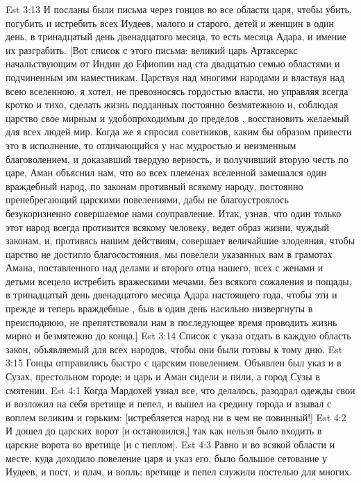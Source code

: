 \vs Est 3:13 И посланы были письма через гонцов во все области царя, чтобы убить, погубить и истребить всех Иудеев, малого и старого, детей и женщин в один день, в тринадцатый день двенадцатого месяца, то есть месяца Адара, и имение их разграбить. [Вот список с этого письма: великий царь Артаксеркс начальствующим от Индии до Ефиопии над ста двадцатью семью областями и подчиненным им наместникам. Царствуя над многими народами и властвуя над всею вселенною, я хотел, не превозносясь гордостью власти, но управляя всегда кротко и тихо, сделать жизнь подданных постоянно безмятежною и, соблюдая царство свое мирным и удобопроходимым до пределов , восстановить желаемый для всех людей мир. Когда же я спросил советников, каким бы образом привести это в исполнение, то отличающийся у нас мудростью и  неизменным благоволением, и доказавший твердую верность, и получивший вторую честь по царе, Аман объяснил нам, что во всех племенах вселенной замешался один враждебный народ, по законам  противный всякому народу, постоянно пренебрегающий царскими повелениями, дабы не благоустроялось безукоризненно совершаемое нами соуправление. Итак, узнав, что один только этот народ всегда противится всякому человеку, ведет образ жизни, чуждый законам, и, противясь нашим действиям, совершает величайшие злодеяния, чтобы царство  не достигло благосостояния, мы повелели указанных вам в грамотах Амана, поставленного над делами и второго отца нашего, всех с женами и детьми всецело истребить вражескими мечами, без всякого сожаления и пощады, в тринадцатый день двенадцатого месяца Адара настоящего года, чтобы эти и прежде и теперь враждебные , быв в один день насильно низвергнуты в преисподнюю, не препятствовали нам в последующее время проводить жизнь мирно и безмятежно до конца.]
\vs Est 3:14 Список с указа отдать в каждую область  закон, объявляемый для всех народов, чтобы они были готовы к тому дню.
\vs Est 3:15 Гонцы отправились быстро с царским повелением. Объявлен был указ и в Сузах, престольном городе; и царь и Аман сидели и пили, а город Сузы  в смятении.
\vs Est 4:1 Когда Мардохей узнал все, что делалось, разодрал одежды свои и возложил на себя вретище и пепел, и вышел на средину города и взывал с воплем великим и горьким: [истребляется народ ни в чем не повинный!]
\vs Est 4:2 И дошел до царских ворот [и остановился,] так как нельзя было входить в царские ворота во вретище [и с пеплом].
\vs Est 4:3 Равно и во всякой области и месте, куда  доходило повеление царя и указ его, было большое сетование у Иудеев, и пост, и плач, и вопль; вретище и пепел служили постелью для многих.
